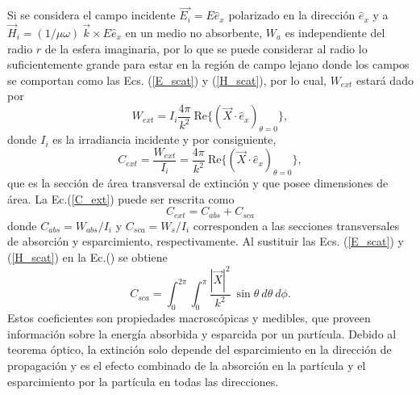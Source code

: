 Si se considera el campo incidente $\Vec{E_i}=E\hat{e}_x$ polarizado en la dirección $\hat{e}_x$ y a $\Vec{H}_i=(1/\mu \omega)\: \Vec{k} \times E \hat{e}_x$ en un medio no absorbente, $W_a$ es independiente del radio $r$ de la esfera imaginaria, por lo que se puede considerar al radio lo suficientemente grande para estar en la región de campo lejano donde los campos se comportan como las Ecs. (\ref{E_scat}) y (\ref{H_scat}), por lo cual, $W_{ext}$ estará dado por \cite{Bohren}
\begin{equation*}
	W_{ext}=I_i\frac{4\pi}{k^2}\:\text{Re}\{(\Vec{X}\cdot\hat{e}_x)_{\theta=0}\},
\end{equation*}
donde $I_i$ es la irradiancia incidente y por consiguiente,
\begin{equation}
	C_{ext}=\frac{W_{ext}}{I_i}=\frac{4\pi}{k^2}\:\text{Re}\{(\Vec{X}\cdot\hat{e}_x)_{\theta=0}\},\label{C_ext}
\end{equation}
que es la sección de área transversal de extinción y que posee dimensiones de área. La Ec.(\ref{C_ext}) puede ser rescrita como
\begin{equation}
	C_{ext}=C_{abs}+C_{sca}
\end{equation}
donde $C_{abs}=W_{abs}/I_i$ y $C_{sca}=W_s/I_i$ corresponden a las secciones transversales de absorción y esparcimiento, respectivamente. Al sustituir las Ecs. (\ref{E_scat}) y (\ref{H_scat}) en la Ec.(\hyperlink{23b}{}) se obtiene
\begin{equation}
	C_{sca}=\int_0^{2\pi}\int_0^{\pi}\frac{|\Vec{X}|^2}{k^2}\:\sin\theta\: d\theta\:d\phi.
	\label{C_sca}
\end{equation}
Estos coeficientes son propiedades macroscópicas y medibles, que proveen información sobre la energía absorbida y esparcida por un partícula. Debido al teorema óptico, la extinción solo depende del esparcimiento en la dirección de propagación y es el efecto combinado de la absorción en la partícula y el esparcimiento por la partícula en todas las direcciones. \\

